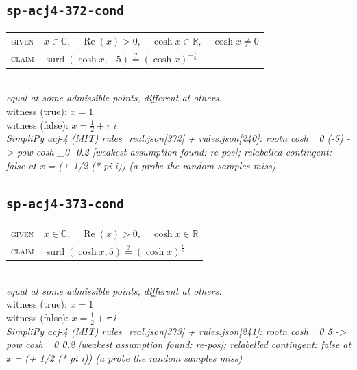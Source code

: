 \documentclass[11pt]{article}
\begin{document}
\subsection*{\texttt{sp-acj4-372-cond}}
\begin{tabular}{@{}l@{\quad}l@{}}
\textsc{given} & $x \in \mathbb{C},\quad \operatorname{Re}\left(x\right) > 0,\quad \cosh x \in \mathbb{R},\quad \cosh x \neq 0$ \\[4pt]
\textsc{claim} & $\displaystyle \operatorname{surd}\left(\cosh x, -5\right) \overset{?}{=} \left(\cosh x\right)^{-\frac{1}{5}}$ \\
\end{tabular}\\[2pt]
{\small\emph{equal at some admissible points, different at others.}}\\
{\footnotesize\color{gray}witness (true): $x = 1$}\\
{\footnotesize\color{gray}witness (false): $x = \frac{1}{2} + \pi \, i$}\\
\emph{SimpliPy acj-4 (MIT) rules\_real.json[372] + rules.json[240]: rootn cosh \_0 (-5)  ->  pow cosh \_0 -0.2  [weakest assumption found: re-pos]; relabelled contingent: false at x = (+ 1/2 (* pi i)) (a probe the random samples miss)}\\

\subsection*{\texttt{sp-acj4-373-cond}}
\begin{tabular}{@{}l@{\quad}l@{}}
\textsc{given} & $x \in \mathbb{C},\quad \operatorname{Re}\left(x\right) > 0,\quad \cosh x \in \mathbb{R}$ \\[4pt]
\textsc{claim} & $\displaystyle \operatorname{surd}\left(\cosh x, 5\right) \overset{?}{=} \left(\cosh x\right)^{\frac{1}{5}}$ \\
\end{tabular}\\[2pt]
{\small\emph{equal at some admissible points, different at others.}}\\
{\footnotesize\color{gray}witness (true): $x = 1$}\\
{\footnotesize\color{gray}witness (false): $x = \frac{1}{2} + \pi \, i$}\\
\emph{SimpliPy acj-4 (MIT) rules\_real.json[373] + rules.json[241]: rootn cosh \_0 5  ->  pow cosh \_0 0.2  [weakest assumption found: re-pos]; relabelled contingent: false at x = (+ 1/2 (* pi i)) (a probe the random samples miss)}\\
\end{document}
